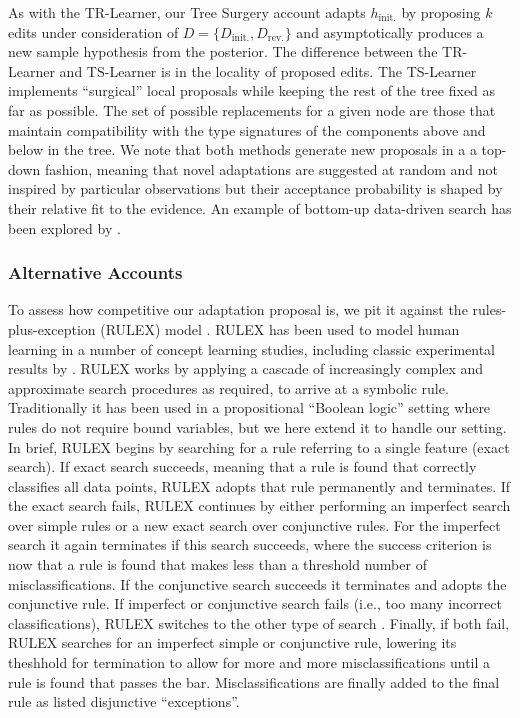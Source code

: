 \documentclass[doc,natbib,floatsintext]{apa7}
\newcommand{\dr}{D_{\mathrm{rev.}}}%
\newcommand{\di}{D_{\mathrm{init.}}}%
\newcommand{\hi}{h_{\mathrm{init.}}}
\begin{document}
As with the TR-Learner, our Tree Surgery account adapts \(\hi\) by proposing \(k\) edits under consideration of  \(D=\{\di,\dr\}\) and asymptotically produces a new sample hypothesis from the posterior. The difference between the TR-Learner and TS-Learner is in the locality of proposed edits. The TS-Learner implements ``surgical'' local proposals while keeping the rest of the tree fixed as far as possible. The set of possible replacements for a given node are those that maintain compatibility with the type signatures of the components above and below in the tree. We note that both methods generate new proposals in a a top-down fashion, meaning that novel adaptations are suggested at random and not inspired by particular observations but their acceptance probability is shaped by their relative fit to the evidence. An example of bottom-up data-driven search has been explored by \cite{bramley2018grounding}.

\subsubsection{Alternative Accounts}
To assess how competitive our adaptation proposal is, we pit it against the rules-plus-exception (RULEX) model \citep{nosofsky1994rule}. RULEX has been used to model human learning in a number of concept learning studies, including classic experimental results by \cite{medin1978context}. RULEX works by applying a cascade of increasingly complex and approximate search procedures as required, to arrive at a symbolic rule. Traditionally it has been used in a propositional ``Boolean logic'' setting where rules do not require bound variables, but we here extend it to handle our setting. In brief, RULEX begins by searching for a rule referring to a single feature (exact search). If exact search succeeds, meaning that a rule is found that correctly classifies all data points, RULEX adopts that rule permanently and terminates. If the exact search fails, RULEX continues by either performing an imperfect search over simple rules or a new exact search over conjunctive rules. For the imperfect search it again terminates if this search succeeds, where the success criterion is now that a rule is found that makes less than a threshold number of misclassifications. If the conjunctive search succeeds it terminates and adopts the conjunctive rule. %
If imperfect or conjunctive search fails (i.e., too many incorrect classifications), RULEX switches to the other type of search \citep[for details, see][]{nosofsky1994rule}. Finally, if both fail, RULEX searches for an imperfect simple or conjunctive rule, lowering its theshhold for termination to allow for more and more misclassifications until a rule is found that passes the bar. Misclassifications are finally added to the final rule as listed disjunctive ``exceptions''. 
\end{document}

